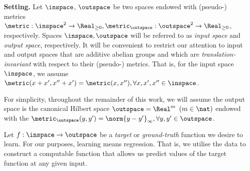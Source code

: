 %
%
%
%
%
%
%

%
\textbf{Setting.}  Let $\inspace$, $\outspace$ be two spaces endowed with (pseudo-) metrics $\metric: \inspace^2 \to \Real_{\geq 0}, \metric_\outspace:\outspace^2 \to \Real_{\geq 0}$, respectively. Spaces $\inspace, \outspace$ will be referred to as \textit{input space} and \textit{output space}, respectively. 
It will be convenient to restrict our attention to input and output spaces that are additive abelian groups and which are \emph{translation-invariant} with respect to their (pseudo-) metrics. That is, for the input space $\inspace$, we assume $ \metric(x+x',x''+x') = \metric(x,x''),\forall x,x',x'' \in \inspace$. 

For simplicity, throughout the remainder of this work, we will assume the output space is the canonical Hilbert space $\outspace = \Real^m$ $(m \in \nat)$ endowed with the $\metric_{\outspace}(y,y') = \norm{y-y'}_\infty, \forall y,y' \in \outspace$. 

Let $f: \inspace \to \outspace$ be a \emph{target} or \emph{ground-truth} function we desire to learn. For our purposes, learning means regression. That is, we utilise the data to construct a computable function that allows us predict values of the target function at any given input.






